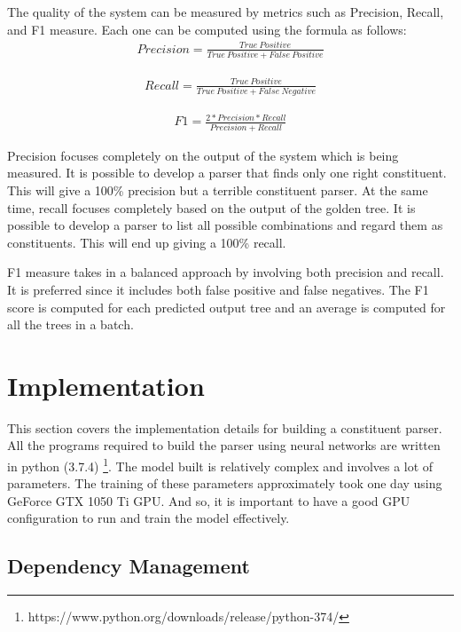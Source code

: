 \documentclass[a4paper, 11pt]{article}
\begin{document}
The quality of the system can be measured by metrics such as Precision, Recall, and F1 measure. Each one can be computed using the formula as follows:
\begin{align*}
Precision = \frac{True\ Positive} {True\ Positive + False\ Positive}
\end{align*}

\begin{align*}
Recall = \frac{True\ Positive} {True\ Positive + False\ Negative}
\end{align*}

\begin{align*}
F1 = \frac{2* Precision * Recall} {Precision + Recall}
\end{align*}

Precision focuses completely on the output of the system which is being measured. It is possible to develop a parser that finds only one right constituent. This will give a 100\% precision but a terrible constituent parser. At the same time, recall focuses completely based on the output of the golden tree. It is possible to develop a parser to list all possible combinations and regard them as constituents. This will end up giving a 100\% recall.

F1 measure takes in a balanced approach by involving both precision and recall. It is preferred since it includes both false positive and false negatives. The F1 score is computed for each predicted output tree and an average is computed for all the trees in a batch. 


\pagebreak
\section{Implementation}

This section covers the implementation details for building a constituent parser. All the programs required to build the parser using neural networks are written in python (3.7.4) \footnote{https://www.python.org/downloads/release/python-374/}. The model built is relatively complex and involves a lot of parameters. The training of these parameters approximately took one day using GeForce GTX 1050 Ti GPU. And so, it is important to have a good GPU configuration to run and train the model effectively. 
\subsection{Dependency Management}
\end{document}
